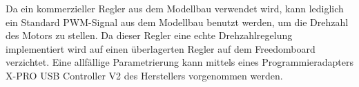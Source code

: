 Da ein kommerzieller Regler aus dem Modellbau verwendet wird, 
kann lediglich ein Standard PWM-Signal aus dem Modellbau benutzt werden, 
um die Drehzahl des Motors zu stellen. Da dieser Regler eine echte 
Drehzahlregelung implementiert wird auf einen überlagerten Regler 
auf dem Freedomboard verzichtet.
Eine allfällige Parametrierung kann mittels eines Programmieradapters
X-PRO USB Controller V2 des Herstellers vorgenommen werden.
